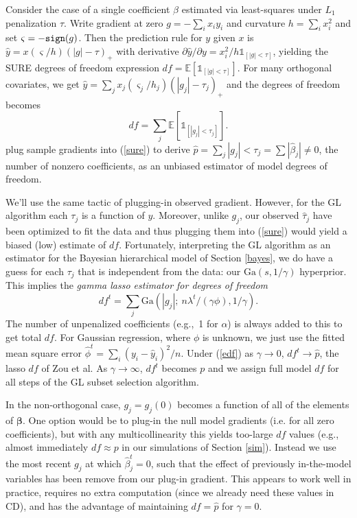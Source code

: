 \documentclass[12pt]{article}
\newcommand{\bs}[1]{\boldsymbol{#1}}
\newcommand{\mr}[1]{\mathrm{#1}}
\newcommand{\ds}[1]{\mathds{#1}}
\begin{document}
Consider the case of a single coefficient $\beta$ estimated via least-squares
under $L_1$ penalization $\tau$.   Write gradient at zero $g = -\sum_i
x_iy_i$ and curvature $h = \sum_i x_i^2$ and set $\varsigma = -{\tt sign}(g)$.
Then the prediction rule for $y$ given $x$ is $\hat y =
x(\varsigma/h)(|g|-\tau)_+$ with  derivative $\partial \hat y/\partial y =
x_i^2/h \ds{1}_{[|g|<\tau]}$, yielding  the SURE degrees of freedom expression
$df = \ds{E}\left[ \ds{1}_{[|g|<\tau]} \right]$.   For many orthogonal
covariates, we get $\hat y = \sum_j x_j(\varsigma_j/h_j)(|g_j|-\tau_j)_+$ and
the degrees of freedom becomes  
\begin{equation} \label{sure} df = \sum_j
\ds{E}\left[ \ds{1}_{[|g_j|<\tau_j]} \right].
\end{equation}
\cite{zou_degrees_2007} plug sample gradients into (\ref{sure}) to derive
$\hat p = \sum_j |g_j| < \tau_j = \sum |\hat\beta_j| \neq 0$, the number of
nonzero  coefficients, as an unbiased estimator of model
degrees of freedom.


We'll use the same tactic of plugging-in observed gradient.  However, for the
GL algorithm each $\tau_j$ is a function of $y$.  Moreover, unlike $g_j$, our
observed $\hat\tau_j$ have been optimized to fit the data and thus  plugging
them into (\ref{sure}) would yield a biased (low) estimate of $df$. Fortunately,
interpreting the GL algorithm as an estimator for the Bayesian  hierarchical
model of Section \ref{bayes},  we do have a guess for each $\tau_j$ that is
independent from the data: our $\mr{Ga}(s,1/\gamma)$ hyperprior. This implies the
{\it gamma lasso estimator for degrees of freedom} \begin{equation}
\label{edf} df^t = \sum_j \mr{Ga}(|g_{j}|;~ n\lambda^t/(\gamma\phi),
1/\gamma). \end{equation}  The number of unpenalized coefficients (e.g.,~1 for
$\alpha$) is always added to this to get total $df$.  For Gaussian regression,
where $\phi$ is unknown, we just use the fitted mean square error $\hat\phi^t
= \sum_i (y_i - \hat y_i)^2/n$. Under (\ref{edf}) as $\gamma \rightarrow 0$,
$df^t \rightarrow \hat p$, the lasso $df$ of Zou et al. As $\gamma \rightarrow
\infty$, $df^t$ becomes $p$ and we assign full model $df$ for all steps of the
GL subset selection algorithm.


In the non-orthogonal case, $g_{j} = g_j(0)$ becomes a function of all of the
elements of $\bs{\beta}$.     One option would be to plug-in the null model
gradients (i.e. for all zero coefficients), but with any multicollinearity
this yields too-large $df$ values (e.g., almost immediately $df \approx p$ in
our simulations of Section \ref{sim}). Instead we use the most recent $g_j$ at
which $\hat\beta^t_j=0$, such that the effect of previously in-the-model
variables has been remove from our plug-in gradient.  This appears to work
well in practice, requires no extra computation (since we already need these
values in CD), and has the advantage of maintaining $df = \hat p$ for $\gamma
= 0$.
\end{document}
